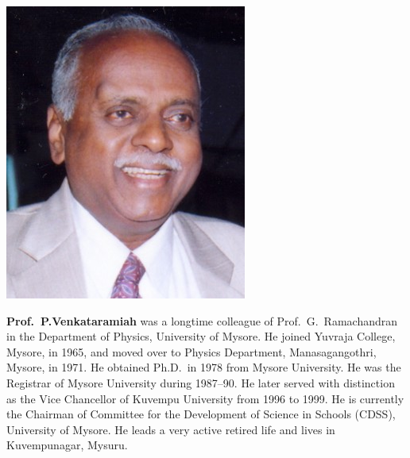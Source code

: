 \centerline{\includegraphics[scale=1.1]{figures/authors/Prof_P_Venkataramaiah.jpg}}
\smallskip

\bigskip

\noindent
\textbf{Prof.\ P.Venkataramiah} was a longtime colleague of Prof.\ G.\ Ramachandran in the Department of Physics, University of Mysore. He joined Yuvraja College, Mysore, in 1965, and moved over to Physics Department, Manasagangothri, Mysore, in 1971. He obtained Ph.D.\ in 1978 from Mysore University. He was the Registrar of Mysore University during 1987--90. He later served with distinction as the Vice Chancellor of Kuvempu University from 1996 to 1999. He is currently the Chairman of Committee for the Development of Science in Schools (CDSS), University of Mysore. He leads a very active retired life and lives in Kuvempunagar, Mysuru.



